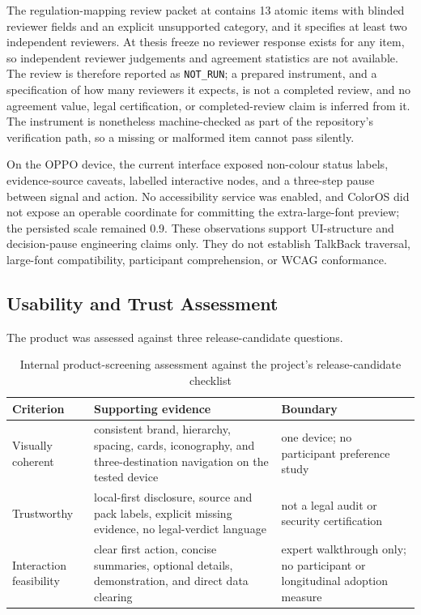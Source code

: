 The regulation-mapping review packet at  contains 13 atomic items with blinded reviewer fields and an explicit unsupported category, and it specifies at least two independent reviewers. At thesis freeze no reviewer response exists for any item, so independent reviewer judgements and agreement statistics are not available. The review is therefore reported as \texttt{NOT\_RUN}; a prepared instrument, and a specification of how many reviewers it expects, is not a completed review, and no agreement value, legal certification, or completed-review claim is inferred from it. The instrument is nonetheless machine-checked as part of the repository's verification path, so a missing or malformed item cannot pass silently.

On the OPPO device, the current interface exposed non-colour status labels, evidence-source caveats, labelled interactive nodes, and a three-step pause between signal and action. No accessibility service was enabled, and ColorOS did not expose an operable coordinate for committing the extra-large-font preview; the persisted scale remained 0.9. These observations support UI-structure and decision-pause engineering claims only. They do not establish TalkBack traversal, large-font compatibility, participant comprehension, or WCAG conformance.

\subsection{Usability and Trust Assessment}

The product was assessed against three release-candidate questions.

\begin{table}[H]
\centering
\small
\caption{Internal product-screening assessment against the project's release-candidate checklist}
\label{tab:expert-screening}
\begin{tabular}{>{\raggedright\arraybackslash}p{}>{\raggedright\arraybackslash}p{}>{\raggedright\arraybackslash}p{}}
\toprule
Criterion & Supporting evidence & Boundary \\
\midrule
Visually coherent & consistent brand, hierarchy, spacing, cards, iconography, and three-destination navigation on the tested device & one device; no participant preference study \\
Trustworthy & local-first disclosure, source and pack labels, explicit missing evidence, no legal-verdict language & not a legal audit or security certification \\
Interaction feasibility & clear first action, concise summaries, optional details, demonstration, and direct data clearing & expert walkthrough only; no participant or longitudinal adoption measure \\
\bottomrule
\end{tabular}
\end{table}

